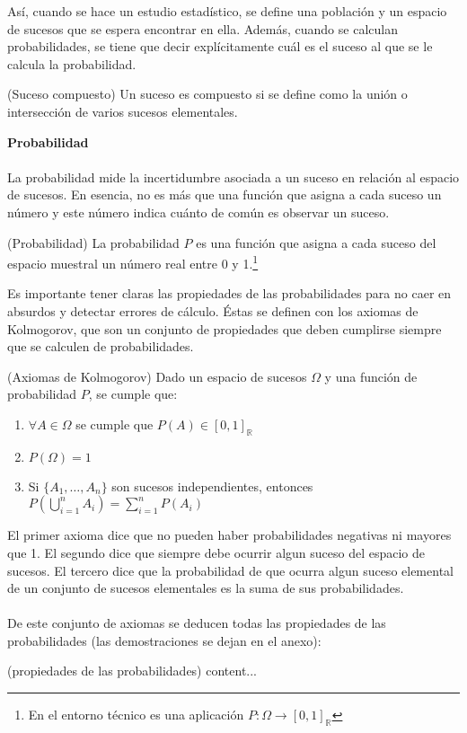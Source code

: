 Así, cuando se hace un estudio estadístico, se define una población y un espacio de sucesos que se espera encontrar en ella. Además, cuando se calculan probabilidades, se tiene que decir explícitamente cuál es el suceso al que se le calcula la probabilidad.
\begin{example}

	\label{ex: espacio_sucesos}
\end{example}
\begin{definition}(Suceso compuesto)
Un suceso es compuesto si se define como la unión o intersección de varios sucesos elementales.
\end{definition}
\begin{example}

\end{example}
\textbf{Probabilidad}\\\\
La probabilidad mide la incertidumbre asociada a un suceso en relación al espacio de sucesos. En esencia, no es más que una función que asigna a cada suceso un número y este número indica cuánto de común es observar un suceso.
\begin{definition}(Probabilidad)
La probabilidad $P$ es una función que asigna a cada suceso del espacio muestral un número real entre 0 y 1.\footnote{ En el entorno técnico es una aplicación $P: \Omega \longrightarrow [0, 1]_{\mathbb{R}}$}
\end{definition}
Es importante tener claras las propiedades de las probabilidades para no caer en absurdos y detectar errores de cálculo. Éstas se definen con los axiomas de Kolmogorov, que son un conjunto de propiedades que deben cumplirse siempre que se calculen de probabilidades.
\begin{definition}(Axiomas de Kolmogorov)
Dado un espacio de sucesos $\Omega$ y una función de probabilidad $P$, se cumple que:
\begin{enumerate}
	\item $\forall A \in \Omega$ se cumple que $P(A) \in [0, 1]_{\mathbb{R}}$
	\item $P(\Omega) = 1$
	\item Si $\lbrace A_1,\ldots,A_n \rbrace$ son sucesos independientes, entonces $P(\bigcup_{i=1}^n{A_i}) = \sum_{i=1}^n{P(A_i)}$
\end{enumerate}
\end{definition}
El primer axioma dice que no pueden haber probabilidades negativas ni mayores que 1. El segundo dice que siempre debe ocurrir algun suceso del espacio de sucesos. El tercero dice que la probabilidad de que ocurra algun suceso elemental de un conjunto de sucesos elementales es la suma de sus probabilidades.\\\\
De este conjunto de axiomas se deducen todas las propiedades de las probabilidades (las demostraciones se dejan en el anexo):
\begin{definition}(propiedades de las probabilidades)
	content...
\end{definition}
